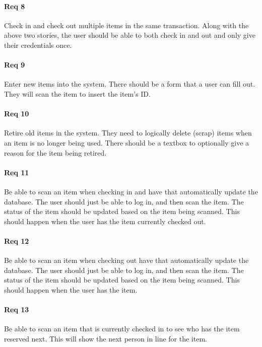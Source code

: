 \documentclass[10pt, onecolumn, twoside, peerreview]{IEEEtran}
\begin{document}
\paragraph*{Req 8} Check in and check out multiple items in the same transaction. Along with the above two stories, the user should be
able to both check in and out and only give their credentials once.\\

\paragraph*{Req 9} Enter new items into the system. There should be a form that a user can fill out. They will scan the item to insert the
item’s ID.\\

\paragraph*{Req 10} Retire old items in the system. They need to logically delete (scrap) items when an item is no longer being used. There
should be a textbox to optionally give a reason for the item being retired.\\

\paragraph*{Req 11} Be able to scan an item when checking in and have that automatically update the database. The user should just be able
to log in, and then scan the item. The status of the item should be updated based on the item being scanned. This
should happen when the user has the item currently checked out.\\

\paragraph*{Req 12} Be able to scan an item when checking out have that automatically update the database. The user should just be able to
log in, and then scan the item. The status of the item should be updated based on the item being scanned. This should
happen when the user has the item.\\

\paragraph*{Req 13} Be able to scan an item that is currently checked in to see who has the item reserved next. This will show the next
person in line for the item.\\
\end{document}
